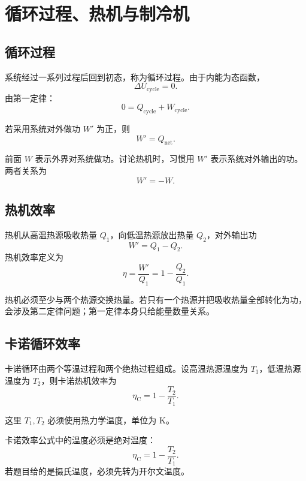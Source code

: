 \section{循环过程、热机与制冷机}

\subsection{循环过程}

系统经过一系列过程后回到初态，称为循环过程。由于内能为态函数，
\[
  \Delta U_{\mathrm{cycle}}=0.
\]
由第一定律：
\[
  0=Q_{\mathrm{cycle}}+W_{\mathrm{cycle}}.
\]

若采用系统对外做功 \(W'\) 为正，则
\[
  W'=Q_{\mathrm{net}}.
\]

\begin{WarnBox}[符号切换]
前面 \(W\) 表示外界对系统做功。讨论热机时，习惯用 \(W'\) 表示系统对外输出的功。两者关系为
\[
  W'=-W.
\]
\end{WarnBox}

\subsection{热机效率}

热机从高温热源吸收热量 \(Q_1\)，向低温热源放出热量 \(Q_2\)，对外输出功
\[
  W'=Q_1-Q_2.
\]
热机效率定义为
\[
  \boxed{
  \eta
  =
  \frac{W'}{Q_1}
  =
  1-\frac{Q_2}{Q_1}
  }.
\]

\begin{KeyBox}[正循环与热机]
热机必须至少与两个热源交换热量。若只有一个热源并把吸收热量全部转化为功，会涉及第二定律问题；第一定律本身只给能量数量关系。
\end{KeyBox}

\subsection{卡诺循环效率}

卡诺循环由两个等温过程和两个绝热过程组成。设高温热源温度为 \(T_1\)，低温热源温度为 \(T_2\)，则卡诺热机效率为
\[
  \boxed{
  \eta_{\mathrm C}=1-\frac{T_2}{T_1}
  }.
\]

这里 \(T_1,T_2\) 必须使用热力学温度，单位为 \(\mathrm K\)。

\begin{WarnBox}
卡诺效率公式中的温度必须是绝对温度：
\[
  \eta_{\mathrm C}=1-\frac{T_2}{T_1}.
\]
若题目给的是摄氏温度，必须先转为开尔文温度。
\end{WarnBox}

